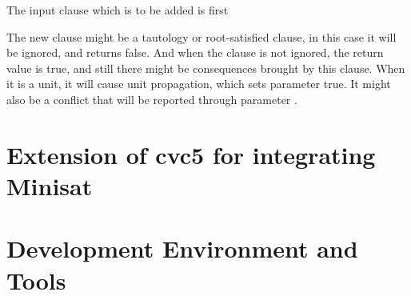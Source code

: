 
The input clause which is to be added is first

The new clause might be a tautology or root-satisfied clause, in this case it will be ignored, and  returns false. And when the clause is not ignored, the return value is true, and still there might be consequences brought by this clause. When it is a unit, it will cause unit propagation, which sets parameter  true. It might also be a conflict that will be reported through parameter .





\section{Extension of cvc5 for integrating Minisat}




\section{Development Environment and Tools}


